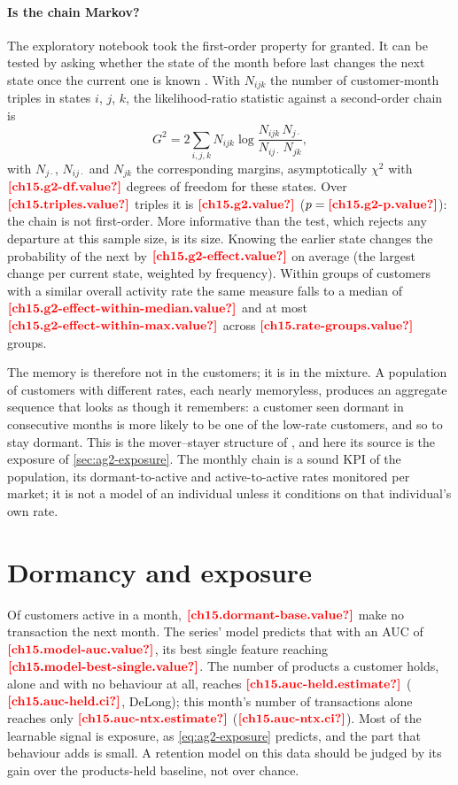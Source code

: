 \paragraph{Is the chain Markov?} The exploratory notebook took the first-order property for granted. It can be tested by
asking whether the state of the month before last changes the next state once the current one is known \autocite{anderson1957}. With
$N_{ijk}$ the number of customer-month triples in states $i$, $j$, $k$, the likelihood-ratio statistic against a
second-order chain is
\begin{equation}\label{eq:cd-g2}
  G^2 = 2 \sum_{i,j,k} N_{ijk} \log \frac{N_{ijk}\, N_{j\cdot}}{N_{ij\cdot}\, N_{jk}} ,
\end{equation}
with $N_{j\cdot}$, $N_{ij\cdot}$ and $N_{jk}$ the corresponding margins, asymptotically $\chi^2$ with
$\est{ch15.g2-df}{value}$ degrees of freedom for these states. Over $\est{ch15.triples}{value}$ triples it is
$\est{ch15.g2}{value}$ ($p = \est{ch15.g2-p}{value}$): the chain is not first-order. More informative than the test, which
rejects any departure at this sample size, is its size. Knowing the earlier state changes the probability of the next by
$\est{ch15.g2-effect}{value}$ on average (the largest change per current state, weighted by frequency). Within groups of
customers with a similar overall activity rate the same measure falls to a median of $\est{ch15.g2-effect-within-median}{value}$
and at most $\est{ch15.g2-effect-within-max}{value}$ across $\est{ch15.rate-groups}{value}$ groups.

The memory is therefore not in the customers; it is in the mixture. A population of customers with different rates, each
nearly memoryless, produces an aggregate sequence that looks as though it remembers: a customer seen dormant in consecutive months is more
likely to be one of the low-rate customers, and so to stay dormant. This is the mover--stayer structure of
\textcite{frydman1984}, and here its source is the exposure of \cref{sec:ag2-exposure}. The monthly chain is a sound KPI of
the population, its dormant-to-active and active-to-active rates monitored per market; it is not a model of an individual
unless it conditions on that individual's own rate.

\section{Dormancy and exposure}\label{sec:cd-dormancy}

Of customers active in a month, $\est{ch15.dormant-base}{value}$ make no transaction the next month. The series' model
predicts that with an AUC of $\est{ch15.model-auc}{value}$, its best single feature reaching $\est{ch15.model-best-single}{value}$.
The number of products a customer holds, alone and with no behaviour at all, reaches $\est{ch15.auc-held}{estimate}$
($\est{ch15.auc-held}{ci}$, DeLong); this month's number of transactions alone reaches only
$\est{ch15.auc-ntx}{estimate}$ ($\est{ch15.auc-ntx}{ci}$). Most of the learnable signal is exposure, as \cref{eq:ag2-exposure}
predicts, and the part that behaviour adds is small. A retention model on this data should be judged by its gain over the
products-held baseline, not over chance.

